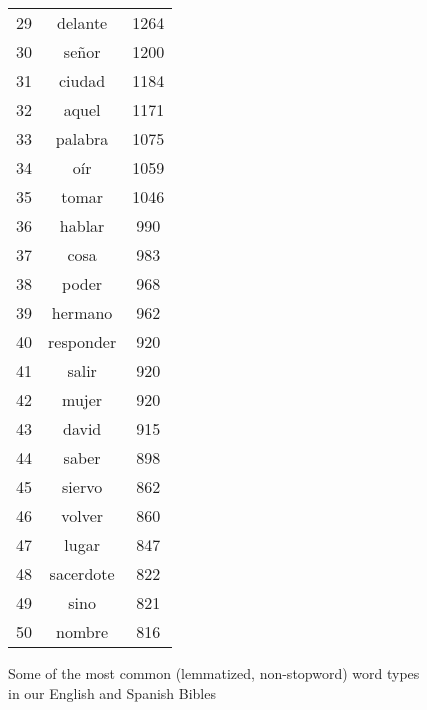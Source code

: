 \begin{figure*}
\begin{tiny}
\begin{centering}
\begin{tabular}{|r|c|c|}
29 & delante & 1264 \\
30 & señor & 1200 \\
31 & ciudad & 1184 \\
32 & aquel & 1171 \\
33 & palabra & 1075 \\
34 & oír & 1059 \\
35 & tomar & 1046 \\
36 & hablar & 990 \\
37 & cosa & 983 \\
38 & poder & 968 \\
39 & hermano & 962 \\
40 & responder & 920 \\
41 & salir & 920 \\
42 & mujer & 920 \\
43 & david & 915 \\
44 & saber & 898 \\
45 & siervo & 862 \\
46 & volver & 860 \\
47 & lugar & 847 \\
48 & sacerdote & 822 \\
49 & sino & 821 \\
50 & nombre & 816 \\
    \hline
  \end{tabular}
  \end{centering}
  \end{tiny}
  \caption{Some of the most common (lemmatized, non-stopword) word types in our
  English and Spanish Bibles}
  \label{fig:mostcommon-en-es}
\end{figure*}


